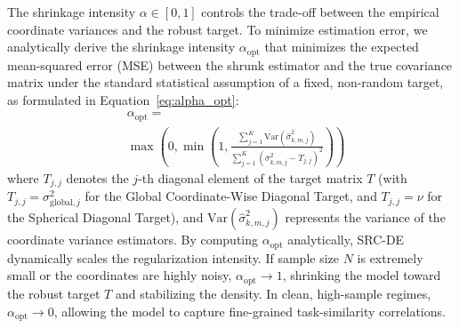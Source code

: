 The shrinkage intensity $\alpha \in [0, 1]$ controls the trade-off between the empirical coordinate variances and the robust target. To minimize estimation error, we analytically derive the shrinkage intensity $\alpha_{\text{opt}}$ that minimizes the expected mean-squared error (MSE) between the shrunk estimator and the true covariance matrix under the standard statistical assumption of a fixed, non-random target, as formulated in Equation~\ref{eq:alpha_opt}:
\begin{equation}
\label{eq:alpha_opt}
\begin{split}
    &\alpha_{\text{opt}} = \\
    &\max\left(0, \min\left(1, \frac{\sum_{j=1}^K \text{Var}(\hat{\sigma}^2_{k, m, j})}{\sum_{j=1}^K (\sigma^2_{k, m, j} - T_{j, j})^2}\right)\right)
\end{split}
\end{equation}
where $T_{j, j}$ denotes the $j$-th diagonal element of the target matrix $T$ (with $T_{j, j} = \sigma^2_{\text{global}, j}$ for the Global Coordinate-Wise Diagonal Target, and $T_{j, j} = \nu$ for the Spherical Diagonal Target), and $\text{Var}(\hat{\sigma}^2_{k, m, j})$ represents the variance of the coordinate variance estimators. By computing $\alpha_{\text{opt}}$ analytically, SRC-DE dynamically scales the regularization intensity. If sample size $N$ is extremely small or the coordinates are highly noisy, $\alpha_{\text{opt}} \to 1$, shrinking the model toward the robust target $T$ and stabilizing the density. In clean, high-sample regimes, $\alpha_{\text{opt}} \to 0$, allowing the model to capture fine-grained task-similarity correlations.

